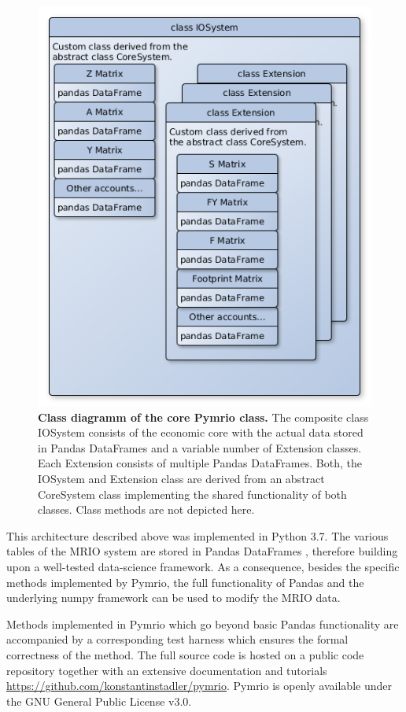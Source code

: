 \documentclass{jors}
\begin{document}
\begin{figure}[h!]
  \includegraphics[width=.9\textwidth]{./fig/IOSystem.png}
  \caption{\textbf{Class diagramm of the core Pymrio class.}
  The composite class IOSystem consists of the economic core with the actual data stored in Pandas DataFrames and a variable number of Extension classes. Each Extension consists of multiple Pandas DataFrames. Both, the IOSystem and Extension class are derived from an abstract CoreSystem class implementing the shared functionality of both classes. Class methods are not depicted here.}
  \end{figure}

This architecture described above was implemented in Python 3.7.
The various tables of the MRIO system are stored in Pandas DataFrames \cite{mckinney2010_Data}, therefore building upon a well-tested data-science framework.
As a consequence, besides the specific methods implemented by Pymrio, the full functionality of Pandas and the underlying numpy framework \cite{vanderwalt2011_NumPy} can be used to modify the MRIO data.

Methods implemented in Pymrio which go beyond basic Pandas functionality are accompanied by a corresponding test harness which ensures the formal correctness of the method.
The full source code is hosted on a public code repository together with an extensive documentation and tutorials \url{https://github.com/konstantinstadler/pymrio}.  
Pymrio is openly available under the GNU General Public License v3.0.
\end{document}
